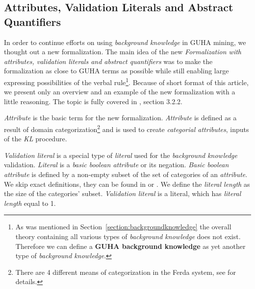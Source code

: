 \documentclass{llncs}
\begin{document}
\subsection{Attributes, Validation Literals and Abstract Quantifiers}
\label{section:formalization}
In order to continue efforts on using \emph{background knowledge} in GUHA
mining, we thought out a new formalization. The main idea of the new 
\emph{Formalization with attributes, validation literals and abstract quantifiers}
was to make the formalization as close to GUHA terms as possible while still 
enabling large expressing possibilities of the verbal rule\footnote{As was mentioned
in Section~\ref{section:backgroundknowledge} the overall theory containing all 
various types of \emph{background knowledge} does not exist. Therefore we can
define a \textbf{GUHA background knowledge} as yet another type of \emph{background
knowledge}.}. Because of short format of this article, we present only an overview
and an example of the new formalization with a little reasoning. The topic is fully
covered in \cite{Diplomka}, section 3.2.2.

\medskip
\emph{Attribute} is the basic term for the new formalization. \emph{Attribute}
is defined as a result of domain categorization\footnote{There are 4 different means
of categorization in the Ferda system, see \cite{Ferda} for details.} and is used
to create \emph{categorial attributes}, inputs of the \emph{KL} procedure. 

\medskip
\emph{Validation literal} is a special type of \emph{literal} used for the
\emph{background knowledge} validation. \emph{Literal} is a \emph{basic boolean 
attribute} or its negation. \emph{Basic boolean attribute} is defined by a non-empty subset
of the set of categories of an \emph{attribute}. We skip exact definitions, they
can be found in \cite{Kuchar} or \cite{Rauch}. We define the \emph{literal length}
as the size of the categories' subset. \emph{Validation literal} is a literal,
which has \emph{literal length} equal to 1.
\end{document}
